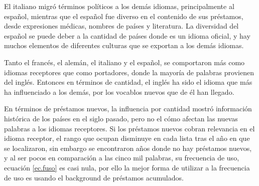 El italiano migró términos políticos a los demás idiomas, principalmente al español,  mientras que el español fue diverso en el contenido de sus préstamos,  desde expresiones médicas, nombres de países y  literatura. La diversidad del español se puede deber a la cantidad de países donde es un idioma oficial,  y hay muchos elementos de diferentes culturas que se exportan a los demás idiomas. 

Tanto el francés, el alemán, el italiano y el español,  se comportaron más como idiomas receptores que como portadores,  donde la mayoría de palabras provienen del inglés.  Entonces en términos de cantidad, el inglés ha sido el idioma que más ha influenciado a los demás, por los vocablos nuevos que de él han llegado.  


En términos de préstamos nuevos,  la influencia por cantidad mostró información histórica de los países en el siglo pasado,  pero no el cómo afectan las nuevas palabras a los idiomas receptores. Si los préstamos nuevos cobran relevancia en el idioma receptor, el rango que ocupan disminuye en cada lista tras el año en que se localizaron,  sin embargo se encontraron años donde no hay préstamos nuevos, y al ser pocos en comparación a las cinco mil palabras, su frecuencia de uso, ecuación \ref{ec.fuso} es casi nula, por ello la mejor forma de utilizar a la frecuencia de uso es usando el background de préstamos acumulados. 
















	